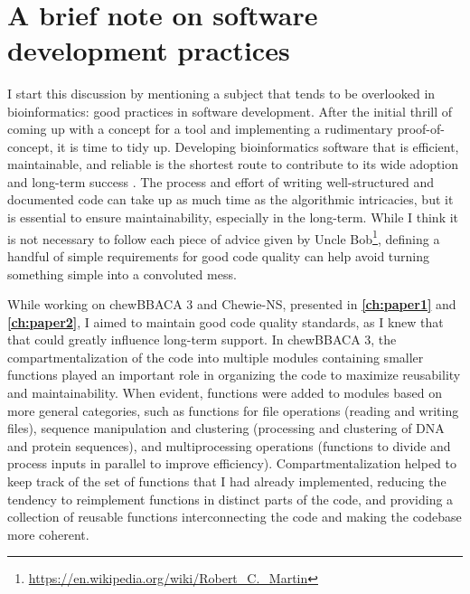 \renewcommand*{\thefootnote}{\arabic{footnote}}

\mbox{}\\
\vspace{8cm}

\section{A brief note on software development practices}

I start this discussion by mentioning a subject that tends to be overlooked in bioinformatics: good practices in software development. After the initial thrill of coming up with a concept for a tool and implementing a rudimentary proof-of-concept, it is time to tidy up. Developing bioinformatics software that is efficient, maintainable, and reliable is the shortest route to contribute to its wide adoption and long-term success \cite{jimenez_four_2017, coelho_for_2024, black_ten_2020}. The process and effort of writing well-structured and documented code can take up as much time as the algorithmic intricacies, but it is essential to ensure maintainability, especially in the long-term. While I think it is not necessary to follow each piece of advice given by Uncle Bob\footnote{\url{https://en.wikipedia.org/wiki/Robert_C._Martin}}, defining a handful of simple requirements for good code quality can help avoid turning something simple into a convoluted mess.

While working on chewBBACA 3 and Chewie-NS, presented in \textbf{\autoref{ch:paper1}} and \textbf{\autoref{ch:paper2}}, I aimed to maintain good code quality standards, as I knew that that could greatly influence long-term support. In chewBBACA 3, the compartmentalization of the code into multiple modules containing smaller functions played an important role in organizing the code to maximize reusability and maintainability. When evident, functions were added to modules based on more general categories, such as functions for file operations (reading and writing files), sequence manipulation and clustering (processing and clustering of DNA and protein sequences), and multiprocessing operations (functions to divide and process inputs in parallel to improve efficiency). Compartmentalization helped to keep track of the set of functions that I had already implemented, reducing the tendency to reimplement functions in distinct parts of the code, and providing a collection of reusable functions interconnecting the code and making the codebase more coherent.

